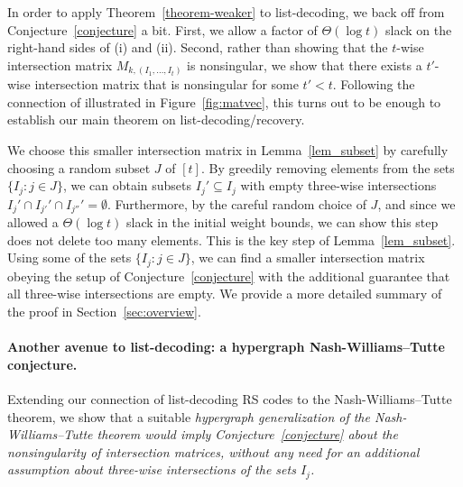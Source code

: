 \documentclass[11pt]{article}
\newcommand{\ryl}[1]{{\color{red} {\small [Ray: #1]}}}
\begin{document}
In order to apply Theorem~\ref{theorem-weaker} to list-decoding, we back off from Conjecture~\ref{conjecture} a bit. First, we allow a factor of $\Theta(\log t)$ slack on the right-hand sides of (i) and (ii). Second, rather than showing that the $t$-wise intersection matrix $M_{k,(I_1,\dots,I_t)}$ is nonsingular, we show that there exists a $t'$-wise intersection matrix that is nonsingular for some $t' < t$. Following the connection of \cite{shangguan2019combinatorial0} illustrated in Figure~\ref{fig:matvec}, this turns out to be enough to establish our main theorem on list-decoding/recovery.

We choose this smaller intersection matrix in Lemma~\ref{lem_subset} by carefully choosing a random subset $J$ of $[t]$. By greedily removing elements from the sets $\{I_j:j\in J\}$, we can obtain subsets $I_j'\subseteq I_j$ with empty three-wise intersections $I_j'\cap I_{j'}'\cap I_{j''}'=\emptyset$. Furthermore, by the careful random choice of $J$, and since we allowed a $\Theta(\log t)$ slack in the initial weight bounds, we can show this step does not delete too many elements. This is the key step of Lemma~\ref{lem_subset}.
Using some of the sets $\{I_j:j\in J\}$, we can find a smaller intersection matrix obeying the setup of Conjecture~\ref{conjecture} with the additional guarantee that all three-wise intersections are empty. We provide a more detailed summary of the proof in Section~\ref{sec:overview}.


\paragraph{Another avenue to list-decoding: a hypergraph Nash-Williams--Tutte conjecture.}
Extending our connection of list-decoding RS codes to the Nash-Williams--Tutte theorem, we show that a suitable \em hypergraph \em generalization of the Nash-Williams--Tutte theorem would imply Conjecture~\ref{conjecture} about the nonsingularity of intersection matrices, without any need for an additional assumption about three-wise intersections of the sets $I_j$.

\end{document}
